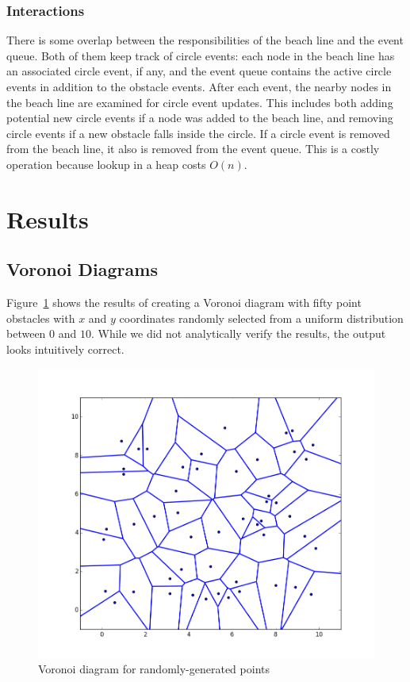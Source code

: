 \documentclass[conference]{IEEEtran}
\begin{document}
\subsubsection{Interactions}
There is some overlap between the responsibilities of the beach line and the event
queue. Both of them keep track of circle events: each node in the beach line
has an associated circle event, if any, and the event queue contains the
active circle events in addition to the obstacle events. After each event,
the nearby nodes in the beach line are examined for circle event updates. This
includes both adding potential new circle events if a node was added to the
beach line, and removing circle events if a new obstacle falls inside the
circle. If a circle event is removed from the beach line, it also is removed
from the event queue. This is a costly operation because lookup in a heap
costs $O(n)$.

\section{Results}
\subsection{Voronoi Diagrams}
Figure~\ref{voronoi} shows the results of creating a Voronoi diagram with fifty
point obstacles with $x$ and $y$ coordinates randomly selected from a uniform
distribution between $0$ and $10$. While we did not analytically verify the
results, the output looks intuitively correct.

\begin{figure}[tp]
    \includegraphics[width=\columnwidth]{50}
    \caption{Voronoi diagram for randomly-generated points}\label{voronoi}
\end{figure}
\end{document}
